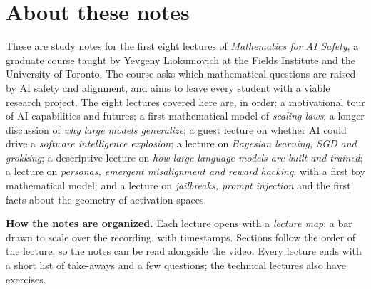 
\chapter*{About these notes}

These are study notes for the first eight lectures of \emph{Mathematics for AI Safety}, a graduate course taught by Yevgeny Liokumovich
at the Fields Institute and the University of Toronto. The course asks which mathematical questions are raised by AI safety and alignment,
and aims to leave every student with a viable research project. The eight lectures covered here are, in order: a motivational tour of AI
capabilities and futures; a first mathematical model of \emph{scaling laws}; a longer discussion of \emph{why large models generalize}; a guest lecture on whether AI could drive a \emph{software intelligence explosion};
a lecture on \emph{Bayesian learning, SGD and grokking}; a descriptive lecture on \emph{how large language models are built and trained}; a lecture on \emph{personas, emergent misalignment and reward hacking}, with a first toy mathematical model; and a lecture on \emph{jailbreaks, prompt injection} and the first facts about the geometry of activation spaces.

\begin{tcolorbox}[notebox={accent}{5}]
\textbf{How the notes are organized.} Each lecture opens with a \emph{lecture map}: a bar drawn to scale over the recording, with timestamps.
Sections follow the order of the lecture, so the notes can be read alongside the video. Every lecture ends with a short list of
take-aways and a few questions; the technical lectures also have exercises.
\end{tcolorbox}

